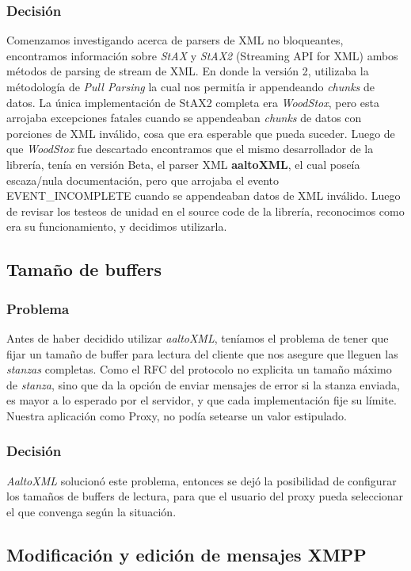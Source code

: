 \documentclass[a4paper,10pt]{article}
\begin{document}
\subsubsection{Decisión}
Comenzamos investigando acerca de parsers de XML no bloqueantes, encontramos información sobre \textit{StAX} y \textit{StAX2} 
(Streaming API for XML) ambos métodos de parsing de stream de XML. En donde la versión 2, utilizaba la métodología de 
\textit{Pull Parsing} la cual nos permitía ir appendeando \textit{chunks} de datos. La única implementación de StAX2 completa era
\textit{WoodStox}, pero esta arrojaba excepciones fatales cuando se appendeaban \textit{chunks} de datos con porciones de XML inválido, cosa
que era esperable que pueda suceder. Luego de que \textit{WoodStox} fue descartado encontramos que el mismo desarrollador de la librería,
tenía en versión Beta, el parser XML \textbf{aaltoXML}, el cual poseía escaza/nula documentación, pero que arrojaba el evento EVENT\_INCOMPLETE
cuando se appendeaban datos de XML inválido. Luego de revisar los testeos de unidad en el source code de la librería, reconocimos como
era su funcionamiento, y decidimos utilizarla.

\subsection{Tamaño de buffers}
\subsubsection{Problema}
Antes de haber decidido utilizar \textit{aaltoXML}, teníamos el problema de tener que fijar un tamaño de buffer para lectura del cliente
que nos asegure que lleguen las \textit{stanzas} completas. Como el RFC del protocolo no explicita un tamaño máximo de \textit{stanza}, sino
que da la opción de enviar mensajes de error si la stanza enviada, es mayor a lo esperado por el servidor, y que cada implementación
fije su límite. Nuestra aplicación como Proxy, no podía setearse un valor estipulado.
\subsubsection{Decisión}
\textit{AaltoXML} solucionó este problema, entonces se dejó la posibilidad de configurar los tamaños de buffers de lectura, para que el usuario del
proxy pueda seleccionar el que convenga según la situación.

\subsection{Modificación y edición de mensajes XMPP}
\end{document}
